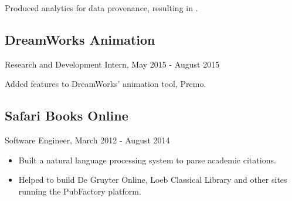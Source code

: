 Produced analytics for data provenance, resulting in \cite{lemay2017automated}.

\subsection*{DreamWorks Animation}
Research and Development Intern,	May 2015 - August 2015
 
Added features to DreamWorks’ animation tool, Premo.

\subsection*{Safari Books Online}
Software Engineer,	March 2012 - August 2014
\begin{itemize}
  \item Built a natural language processing system to parse academic citations.
  \item Helped to build De Gruyter Online, Loeb Classical Library and other sites running the PubFactory platform.
\end{itemize}
